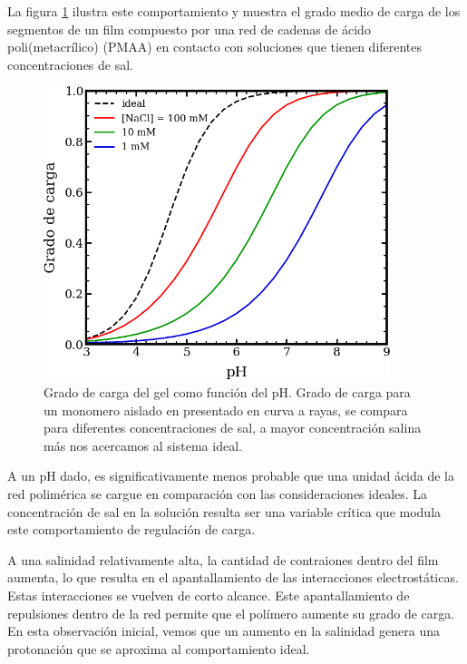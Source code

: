 La figura \ref{fig:film:degree-film} ilustra este comportamiento y muestra el grado medio de carga de los segmentos de un film compuesto por una red de cadenas de \'acido poli(metacrílico) (PMAA) en contacto con soluciones que tienen diferentes concentraciones de sal.



\begin{figure}
    \centering
    \includegraphics[width=0.9\textwidth]{Figures/graph-film/charge_degree-film.png}
    \caption{Grado de carga del gel como funci\'on del pH. Grado de carga para un monomero aislado en presentado en curva a rayas, se compara para diferentes concentraciones de sal, a mayor concentraci\'on salina m\'as nos acercamos al sistema ideal.}
    \label{fig:film:degree-film}
\end{figure}

A un pH dado, es significativamente menos probable que una unidad \'acida de la red polim\'erica se cargue en comparaci\'on con las consideraciones ideales. La concentraci\'on de sal en la soluci\'on resulta ser una variable cr\'itica que modula este comportamiento de regulaci\'on de carga.

A una salinidad relativamente alta, la cantidad de contraiones dentro del film aumenta, lo que resulta en el apantallamiento de las interacciones electrost\'aticas. Estas interacciones se vuelven de corto alcance. Este apantallamiento de repulsiones dentro de la red permite que el pol\'imero aumente su grado de carga. En esta observaci\'on inicial, vemos que un aumento en la salinidad genera una protonaci\'on que se aproxima al comportamiento ideal.

